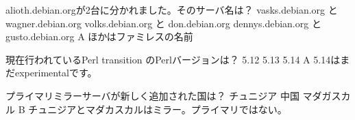 %

\santaku
{alioth.debian.orgが2台に分かれました。そのサーバ名は？}
{vasks.debian.org と wagner.debian.org}
{volks.debian.org と don.debian.org}
{dennys.debian.org と gusto.debian.org}
{A}
{ほかはファミレスの名前}

\santaku
{現在行われているPerl transition のPerlバージョンは？}
{5.12}
{5.13}
{5.14}
{A}
{5.14はまだexperimentalです。}

\santaku
{プライマリミラーサーバが新しく追加された国は？}
{チュニジア}
{中国}
{マダガスカル}
{B}
{チュニジアとマダカスカルはミラー。プライマリではない。}

